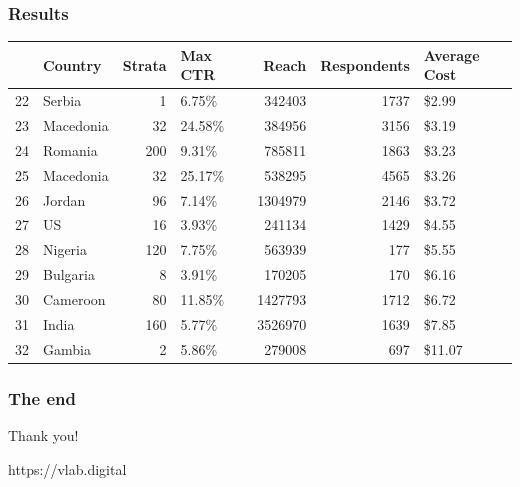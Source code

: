 \documentclass[aspectratio=169]{beamer}
\begin{document}
\begin{frame}
\frametitle{Results}
\begin{table}[H]
\begin{tabular}{llrlrrl}

\toprule
 & Country & Strata & Max CTR & Reach & Respondents & Average Cost \\
\midrule
22 & Serbia & 1 & 6.75\% & 342403 & 1737 & \$2.99 \\
23 & Macedonia & 32 & 24.58\% & 384956 & 3156 & \$3.19 \\
24 & Romania & 200 & 9.31\% & 785811 & 1863 & \$3.23 \\
25 & Macedonia & 32 & 25.17\% & 538295 & 4565 & \$3.26 \\
26 & Jordan & 96 & 7.14\% & 1304979 & 2146 & \$3.72 \\
27 & US & 16 & 3.93\% & 241134 & 1429 & \$4.55 \\
28 & Nigeria & 120 & 7.75\% & 563939 & 177 & \$5.55 \\
29 & Bulgaria & 8 & 3.91\% & 170205 & 170 & \$6.16 \\
30 & Cameroon & 80 & 11.85\% & 1427793 & 1712 & \$6.72 \\
31 & India & 160 & 5.77\% & 3526970 & 1639 & \$7.85 \\
32 & Gambia & 2 & 5.86\% & 279008 & 697 & \$11.07 \\
\bottomrule
\end{tabular}
\end{table}
\end{frame}

\begin{frame}
\frametitle{The end}

\huge{Thank you!}

\small
https://vlab.digital

\end{frame}
\end{document}
